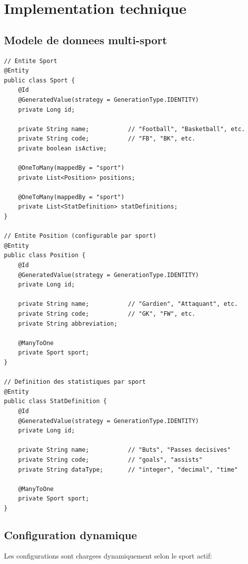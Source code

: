 \section{Implementation technique}

\subsection*{Modele de donnees multi-sport}

\begin{lstlisting}[style=codeblock]
// Entite Sport
@Entity
public class Sport {
    @Id
    @GeneratedValue(strategy = GenerationType.IDENTITY)
    private Long id;

    private String name;           // "Football", "Basketball", etc.
    private String code;           // "FB", "BK", etc.
    private boolean isActive;

    @OneToMany(mappedBy = "sport")
    private List<Position> positions;

    @OneToMany(mappedBy = "sport")
    private List<StatDefinition> statDefinitions;
}

// Entite Position (configurable par sport)
@Entity
public class Position {
    @Id
    @GeneratedValue(strategy = GenerationType.IDENTITY)
    private Long id;

    private String name;           // "Gardien", "Attaquant", etc.
    private String code;           // "GK", "FW", etc.
    private String abbreviation;

    @ManyToOne
    private Sport sport;
}

// Definition des statistiques par sport
@Entity
public class StatDefinition {
    @Id
    @GeneratedValue(strategy = GenerationType.IDENTITY)
    private Long id;

    private String name;           // "Buts", "Passes decisives"
    private String code;           // "goals", "assists"
    private String dataType;       // "integer", "decimal", "time"

    @ManyToOne
    private Sport sport;
}
\end{lstlisting}

\subsection*{Configuration dynamique}

Les configurations sont chargees dynamiquement selon le sport actif:


